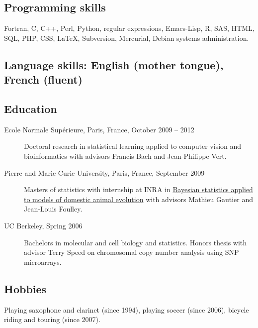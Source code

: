 \documentclass[11pt,a4paper]{article}
\begin{document}
\subsection*{Programming skills}
Fortran, C, C++, Perl, Python, regular expressions, Emacs-Lisp, R,
SAS, HTML, SQL, PHP, CSS, \LaTeX, Subversion, Mercurial, Debian
systems administration.

\subsection*{Language skills: English (mother tongue), French (fluent)}

\subsection*{Education}
\begin{description}
\item[Ecole Normale Sup\'erieure, Paris, France, October 2009 -- 2012]
Doctoral research in statistical learning applied to computer vision
and bioinformatics with advisors Francis Bach and Jean-Philippe Vert.
\item[Pierre and Marie Curie University, Paris, France, September
2009] Masters of statistics with internship at INRA in
\href{http://nicholsonppp.r-forge.r-project.org/}{Bayesian statistics
applied to models of domestic animal evolution} with advisors Mathieu
Gautier and Jean-Louis Foulley.
\item[UC Berkeley, Spring 2006] Bachelors in molecular and cell
  biology and statistics. Honors thesis with advisor Terry Speed on
  chromosomal copy number analysis using SNP microarrays.
\end{description}

\subsection*{Hobbies}
Playing saxophone and clarinet (since 1994), playing soccer (since 2006),
bicycle riding and touring (since 2007).
\end{document}
